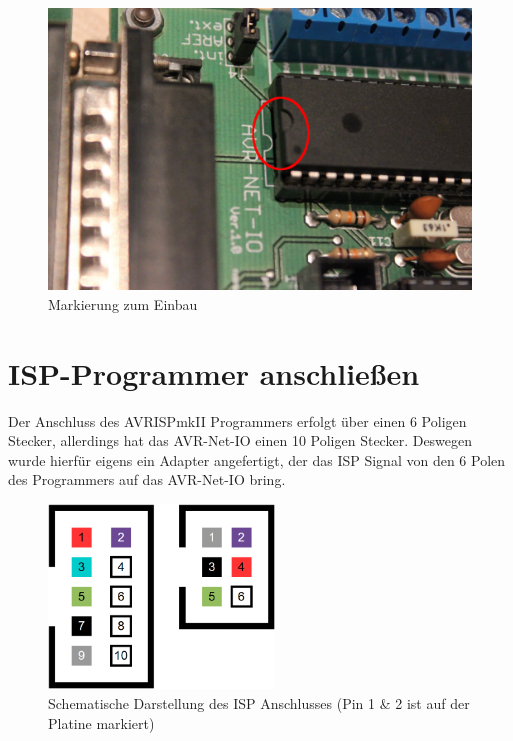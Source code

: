 \begin{figure}[H]
\centering
\includegraphics[width=13cm]{content/pictures/Anleitung/tauscheProzessor/4_Markierung.jpg}
\caption{Markierung zum Einbau}
\label{ausbau4}
\end{figure}

\section{ISP-Programmer anschließen}

Der Anschluss des AVRISPmkII Programmers erfolgt über einen 6 Poligen Stecker,
allerdings hat das AVR-Net-IO einen 10 Poligen Stecker. Deswegen wurde hierfür
eigens ein Adapter angefertigt, der das ISP Signal von den 6 Polen des Programmers
auf das AVR-Net-IO bring.

\begin{figure}[htp]
\begin{center}
  \includegraphics[width=6cm]{content/pictures/Anleitung/ISP-Stecker.png}
  \caption[Schematische Darstellung des ISP Anschlusses]{Schematische Darstellung des ISP Anschlusses (Pin 1 \& 2
  ist auf der Platine markiert)}
  \label{ispanschluss}
\end{center}
\end{figure}


